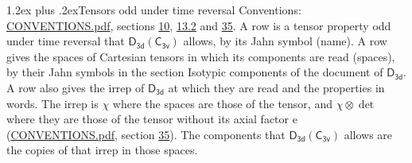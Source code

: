 \documentclass[10pt,a4paper]{article}
\makeatletter
\renewcommand\section{\@startsection{section}{1}{\z@}{-3ex plus -1ex minus -.2ex}%
  {1.2ex plus .2ex}{\normalfont\large\sffamily\bfseries\color{parttitle}}}
\numberwithin{equation}{section}
\newcommand{\grp}[1]{\mathsf{#1}}
\newcommand{\irrprod}{\otimes}
\makeatother
\begin{document}
\section{Tensors odd under time reversal}\label{s:time_odd}
Conventions: \href{../../CONVENTIONS.pdf}{CONVENTIONS.pdf}, sections \href{../../../rotation/CONVENTIONS.pdf\#conv.10}{10}, \href{../../../rotation/CONVENTIONS.pdf\#conv.13.2}{13.2} and \href{../../CONVENTIONS.pdf\#conv.35}{35}.
\leavevmode\label{n:head.name.property}A row is a tensor property odd under time reversal that $\grp{D_{3d}}(\grp{C_{3v}})$ allows, by its Jahn symbol (name). \label{n:head.spaces}A row gives the spaces of Cartesian tensors in which its components are read (spaces), by their Jahn symbols in the section Isotypic components of the document of \href{../../../rotation/data/pdf/D3d.pdf}{$\grp{D_{3d}}$}. \label{n:head.properties}A row also gives the irrep of $\grp{D_{3d}}$ at which they are read and the properties in words. The irrep is $\chi$ where the spaces are those of the tensor, and $\chi \irrprod \det$ where they are those of the tensor without its axial factor e (\href{../../CONVENTIONS.pdf}{CONVENTIONS.pdf}, section \href{../../CONVENTIONS.pdf\#conv.35}{35}). The components that $\grp{D_{3d}}(\grp{C_{3v}})$ allows are the copies of that irrep in those spaces.
\end{document}
